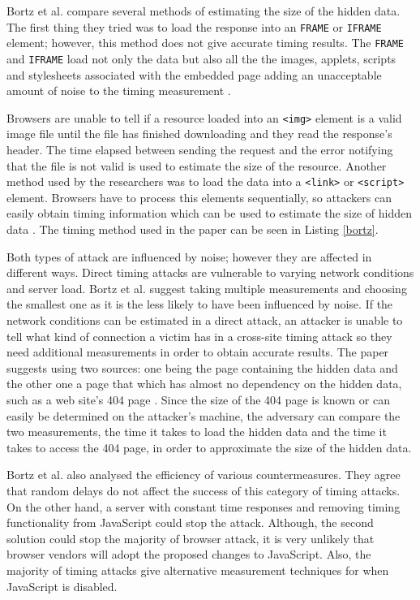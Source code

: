 \documentclass[10pt,a4paper,twoside]{book}
\begin{document}
Bortz et al. compare several methods of estimating the size of the hidden data. The first thing they tried was to load the response into an \texttt{FRAME} or \texttt{IFRAME} element; however, this method does not give accurate timing results. The \texttt{FRAME} and \texttt{IFRAME} load not only the data but also  all the the images, applets, scripts and stylesheets associated with the embedded page adding an unacceptable amount of noise to the timing measurement \cite{bortz2007exposing}.

Browsers are unable to tell if a resource loaded into an \texttt{<img>} element is a valid image file until the file has finished downloading and they read the response's header. The time elapsed between sending the request and the error notifying that the file is not valid is used to estimate the size of the resource. Another method used by the researchers was to load the data into a \texttt{<link>} or \texttt{<script>} element. Browsers have to process this elements sequentially, so attackers can easily obtain timing information which can be used to estimate the size of hidden data \cite{bortz2007exposing}. The timing method used in the paper can be seen in Listing \ref{bortz}.

Both types of attack are influenced by noise; however they are affected in different ways. Direct timing attacks are vulnerable to varying network conditions and server load. Bortz et al. suggest taking multiple measurements and choosing the smallest one as it is the less likely to have been influenced by noise. If the network conditions can be estimated in a direct attack, an attacker is unable to tell what kind of connection a victim has in a cross-site timing attack so they need additional measurements in order to obtain accurate results. The paper suggests using two sources: one being the page containing the hidden data and the other one a page that which has almost no dependency on the hidden data, such as a web site's 404 page \cite{bortz2007exposing}. 
Since the size of the 404 page is known or can easily be determined on the attacker's machine, the adversary can compare the two measurements, the time it takes to load the hidden data and the time it takes to access the 404 page, in order to approximate the size of the hidden data.

Bortz et al. also analysed the efficiency of various countermeasures. They agree that random delays do not affect the success of this category of timing attacks. On the other hand, a server with constant time responses and removing timing functionality from JavaScript could stop the attack. Although, the second solution could stop the majority of browser attack, it is very unlikely that browser vendors will adopt the proposed changes to JavaScript. Also, the majority of timing attacks give alternative measurement techniques for when JavaScript is disabled.
\end{document}

